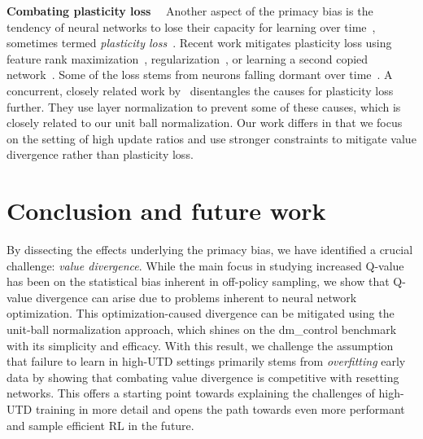 {\bf Combating plasticity loss}~~ Another aspect of the primacy bias is the tendency of neural networks to lose their capacity for learning over time~\parencite{igl2021transient}, sometimes termed \emph{plasticity loss}~\parencite{lyle2021understanding, abbas2023loss}. Recent work mitigates plasticity loss using feature rank maximization~\parencite{kumar2021implicit}, regularization~\parencite{lyle2023understanding}, or learning a second copied network~\parencite{nikishin2024deep}. Some of the loss stems from neurons falling dormant over time~\parencite{sokar2023dormant}. A concurrent, closely related work by~\textcite{lyle2024disentangling} disentangles the causes for plasticity loss further. They use layer normalization to prevent some of these causes, which is closely related to our unit ball normalization. Our work differs in that we focus on the setting of high update ratios and use stronger constraints to mitigate value divergence rather than plasticity loss. 


\section{Conclusion and future work}

By dissecting the effects underlying the primacy bias, we have identified a crucial challenge: \emph{value divergence}. 
While the main focus in studying increased Q-value has been on the statistical bias inherent in off-policy sampling, we show that Q-value divergence can arise due to problems inherent to neural network optimization.
This optimization-caused divergence can be mitigated using the unit-ball normalization approach, which shines on the \textsf{dm\_control} benchmark with its simplicity and efficacy. 
With this result, we challenge the assumption that failure to learn in high-UTD settings primarily stems from \emph{overfitting} early data by showing that combating value divergence is competitive with resetting networks. 
This offers a starting point towards explaining the challenges of high-UTD training in more detail and opens the path towards even more performant and sample efficient RL in the future.

